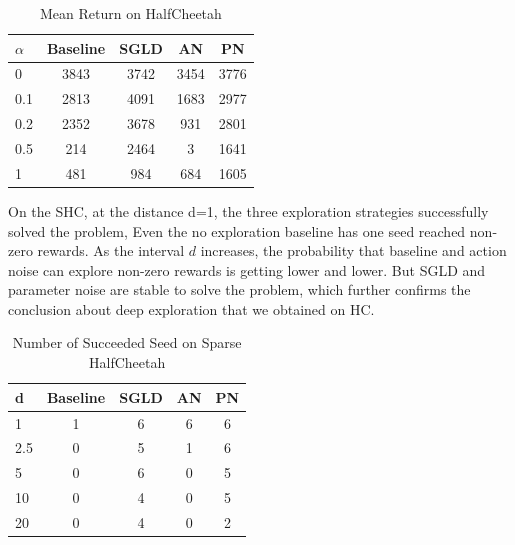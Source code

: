 \begin{table}[htbp]
   \caption{Mean Return on HalfCheetah}
   \label{tab:HC}
   \vskip 0.15in
   \begin{center}
   \begin{tabular}{lcccc}
   \toprule
   $\alpha$ & Baseline & SGLD & AN   & PN \\
   \midrule
   0        & 3843     & 3742 & 3454 & 3776 \\
   0.1      & 2813     & 4091 & 1683 & 2977 \\
   0.2      & 2352     & 3678 & 931  & 2801 \\
   0.5      & 214      & 2464 & 3    & 1641 \\
   1        & 481      &  984 & 684  & 1605 \\
   \bottomrule
   \end{tabular}
   \end{center}
   \vskip -0.1in
   \end{table}


On the SHC, at the distance d=1, the three exploration strategies successfully solved the problem, Even the no exploration baseline has one seed reached non-zero rewards. As the interval $d$ increases, the probability that baseline and action noise can explore non-zero rewards is getting lower and lower. But SGLD and parameter noise are stable to solve the problem, which further confirms the conclusion about deep exploration that we obtained on HC.

\begin{table}[htbp]
   \caption{Number of Succeeded Seed on Sparse HalfCheetah}
   \label{tab:shc}
   \vskip 0.15in
   \begin{center}
   \begin{tabular}{lcccc}
   \toprule
       d    & Baseline & SGLD & AN & PN \\
   \midrule
      1     & 1        & 6    & 6  & 6 \\
      2.5   & 0        & 5    & 1  & 6 \\
      5     & 0        & 6    & 0  & 5 \\
      10    & 0        & 4    & 0  & 5 \\
      20    & 0        & 4    & 0  & 2 \\
   \bottomrule
   \end{tabular}
   \end{center}
   \vskip -0.1in
   \end{table}

